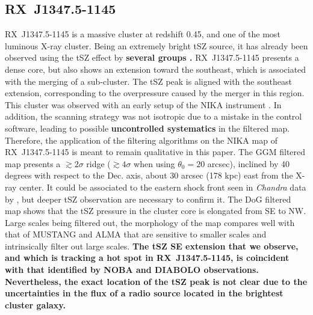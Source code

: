 \documentclass[twocolumn,traditabstract]{aa}
\begin{document}
\subsection{RX~J1347.5-1145}\label{sec:RXJ1347.5-1145}
\mbox{RX~J1347.5-1145} is a massive cluster at redshift 0.45, and one of the most luminous X-ray cluster. Being an extremely bright tSZ source, it has already been observed using the tSZ effect by {\bf several groups \citep[e.g.][]{Komatsu1999,Pointecouteau1999,Kitayama2004,Mason2010,Plagge2012,Adam2014,Sayers2016,Kitayama2016}.} \mbox{RX~J1347.5-1145} presents a dense core, but also shows an extension toward the southeast, which is associated with the merging of a sub-cluster. The tSZ peak is aligned with the southeast extension, corresponding to the overpressure caused by the merger in this region. This cluster was observed with an early setup of the NIKA instrument \citep[bandpass, sensitivity, calibration procedure, see][for more details]{Adam2014}. In addition, the scanning strategy was not isotropic due to a mistake in the control software, leading to possible {\bf uncontrolled systematics} in the filtered map. Therefore, the application of the filtering algorithms on the NIKA map of \mbox{RX~J1347.5-1145} is meant to remain qualitative in this paper. The GGM filtered map presents a $\gtrsim 2 \sigma$ ridge ($\gtrsim 4 \sigma$ when using $\theta_0 = 20$ arcsec), inclined by 40 degrees with respect to the Dec. axis, about 30 arcsec (178 kpc) east from the X-ray center. It could be associated to the eastern shock front seen in \textit{Chandra} data by \cite{Kreisch2016}, but deeper tSZ observation are necessary to confirm it. The DoG filtered map shows that the tSZ pressure in the cluster core is elongated from SE to NW. Large scales being filtered out, the morphology of the map compares well with that of MUSTANG \citep{Mason2010} and ALMA \citep{Kitayama2016} that are sensitive to smaller scales and intrinsically filter out large scales. {\bf The tSZ SE extension that we observe, and which is tracking a hot spot in \mbox{RX~J1347.5-1145}, is coincident with that identified by NOBA \citep[Nobeyama Bolometer Array][]{Kitayama2004} and DIABOLO \citep[on the IRAM 30m telescope][]{Pointecouteau1999,Pointecouteau2001} observations. Nevertheless, the exact location of the tSZ peak is not clear due to the uncertainties in the flux of a radio source located in the brightest cluster galaxy.}

\end{document}
